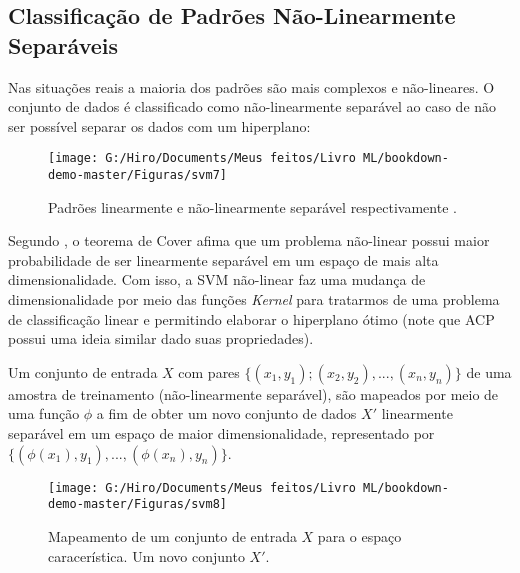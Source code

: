 \documentclass[
]{book}
\begin{document}
\hypertarget{classificauxe7uxe3o-de-padruxf5es-nuxe3o-linearmente-separuxe1veis}{%
\subsection{Classificação de Padrões Não-Linearmente Separáveis}\label{classificauxe7uxe3o-de-padruxf5es-nuxe3o-linearmente-separuxe1veis}}

Nas situações reais a maioria dos padrões são mais complexos e não-lineares. O conjunto de dados é classificado como não-linearmente separável ao caso de não ser possível separar os dados com um hiperplano:

\begin{figure}

{\centering \texttt{[image: G:/Hiro/Documents/Meus feitos/Livro ML/bookdown-demo-master/Figuras/svm7]} 

}

\caption{Padrões linearmente e não-linearmente separável respectivamente \citep{gonccalves2015maquina}.}\label{fig:svm7}
\end{figure}



Segundo \citet{smola2000introduction}, o teorema de Cover afima que um problema não-linear possui maior probabilidade de ser linearmente separável em um espaço de mais alta dimensionalidade. Com isso, a SVM não-linear faz uma mudança de dimensionalidade por meio das funções \emph{Kernel} para tratarmos de uma problema de classificação linear e permitindo elaborar o hiperplano ótimo (note que ACP possui uma ideia similar dado suas propriedades).

Um conjunto de entrada \(X\) com pares \(\{(x_1,y_1);(x_2,y_2),...,(x_n,y_n)\}\) de uma amostra de treinamento (não-linearmente separável), são mapeados por meio de uma função \(\phi\) a fim de obter um novo conjunto de dados \(X'\) linearmente separável em um espaço de maior dimensionalidade, representado por \(\{(\phi(x_1),y_1),...,(\phi(x_n),y_n)\}\).

\begin{figure}

{\centering \texttt{[image: G:/Hiro/Documents/Meus feitos/Livro ML/bookdown-demo-master/Figuras/svm8]} 

}

\caption{Mapeamento de um conjunto de entrada \(X\) para o espaço caracerística. Um novo conjunto \(X'\).}\label{fig:svm8}
\end{figure}
\end{document}
